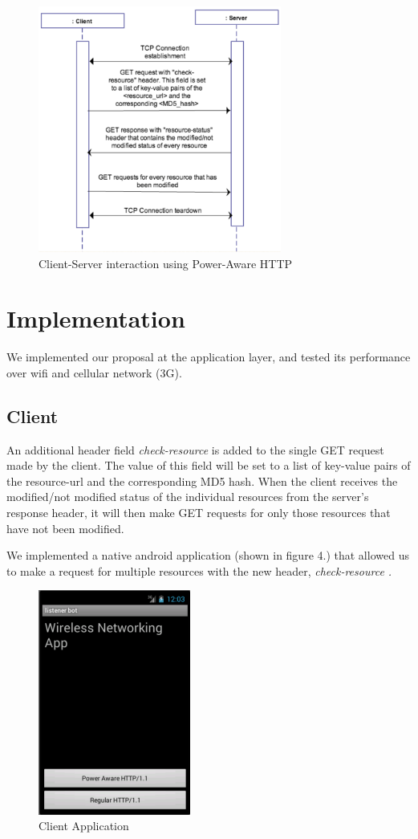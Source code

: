 \documentclass{sigplanconf}
\begin{document}
\begin{figure}[ht!]
\centering
\includegraphics[width=80mm]{proposal}
\caption{Client-Server interaction using Power-Aware HTTP }
\label{fig:sp_gd_mnist}
\end{figure}



\section{Implementation}

We implemented our proposal at the application layer, and tested its performance over wifi and cellular network (3G).

\subsection{Client}

An additional header field {\it check-resource} is added to the single GET request made by the client. 
The value of this field will be set to a list of key-value pairs of the resource-url and the corresponding MD5 hash.  When the client receives the modified/not modified status of the individual resources from the server's response header, it will then make GET requests for only those resources that have not been modified.

We implemented a native android application (shown in figure 4.) that allowed us to make a request for multiple resources with the new header, \it{check-resource} \rm. 

\begin{figure}[ht!]
\centering
\includegraphics[width=50mm]{app2}
\caption{Client Application }
\label{fig:sp_gd_mnist}
\end{figure}
\end{document}
